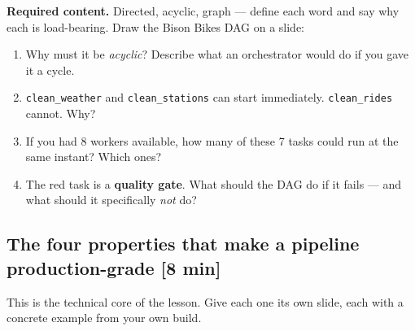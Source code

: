 \documentclass[11pt]{article}
\newcommand{\key}[1]{\textcolor{accent}{\textbf{#1}}}
\newcommand{\tm}[1]{\textcolor{grayish}{\small\textsf{[#1]}}}
\begin{document}
\textbf{Required content.} Directed, acyclic, graph --- define each word and
say why each is load-bearing. Draw the Bison Bikes DAG on a slide:

\begin{center}
\end{center}

\begin{qbox}
\begin{enumerate}
  \item Why must it be \emph{acyclic}? Describe what an orchestrator would do
        if you gave it a cycle.
  \item \texttt{clean\_weather} and \texttt{clean\_stations} can start
        immediately. \texttt{clean\_rides} cannot. Why?
  \item If you had 8 workers available, how many of these 7 tasks could run at
        the same instant? Which ones?
  \item The red task is a \key{quality gate}. What should the DAG do if it
        fails --- and what should it specifically \emph{not} do?
\end{enumerate}
\end{qbox}

\subsection{The four properties that make a pipeline production-grade \tm{8 min}}

This is the technical core of the lesson. Give each one its own slide, each
with a concrete example from your own build.
\end{document}
